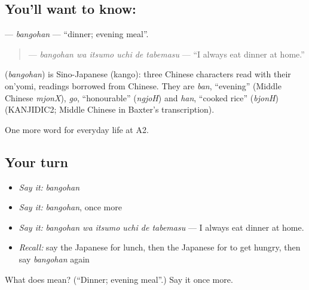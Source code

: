 \subsection*{You'll want to know: }
\textbf{} — \emph{bangohan} — \textquotedblleft{}dinner; evening meal\textquotedblright{}.

\begin{quote}
\textbf{   } — \emph{bangohan wa itsumo uchi de tabemasu} — \textquotedblleft{}I always eat dinner at home.\textquotedblright{}
\end{quote}

\begin{cousinweb}
\textbf{} (\emph{bangohan}) is Sino-Japanese (kango): three Chinese characters read with their on'yomi, readings borrowed from Chinese. They are \emph{ban}, \textquotedblleft{}evening\textquotedblright{} (Middle Chinese \emph{mjonX}), \emph{go}, \textquotedblleft{}honourable\textquotedblright{} (\emph{ngjoH}) and \emph{han}, \textquotedblleft{}cooked rice\textquotedblright{} (\emph{bjonH}) (KANJIDIC2; Middle Chinese in Baxter's transcription).
\end{cousinweb}

\begin{grammarlens}[title={What you've built}]
One more word for everyday life at A2.
\end{grammarlens}

\subsection*{Your turn}
\begin{itemize}
\raggedright
  \item \emph{Say it:} \emph{bangohan}
  \item \emph{Say it:} \emph{bangohan}, once more
  \item \emph{Say it:} \emph{bangohan wa itsumo uchi de tabemasu} — I always eat dinner at home.
  \item \emph{Recall:} say the Japanese for lunch, then the Japanese for to get hungry, then say \emph{bangohan} again
\end{itemize}

\begin{tcolorbox}[breakable,colback=teal!4,colframe=teal!35!black,title={Before you move on}]
What does  mean? (\textquotedblleft{}Dinner; evening meal\textquotedblright{}.) Say it once more.
\end{tcolorbox}
